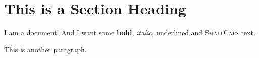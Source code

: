 \documentclass[a4paper, 12pt]{article}
\begin{document}
  \section{This is a Section Heading}
  I am a document! And I want some 
  \textbf{bold}, \textit{italic}, 
  \underline{underlined} and 
  \textsc{SmallCaps} text.

  \noindent
  This is another paragraph.
\end{document}
